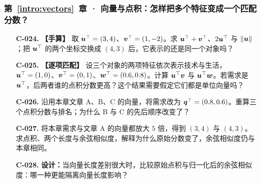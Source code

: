 \subsubsection*{第~\ref*{intro:vectors}~章 · 向量与点积：怎样把多个特征变成一个匹配分数？}
\begin{enumerate}[label={},leftmargin=4.8em,itemsep=4pt]
\item[\textbf{C-024.}] \leavevmode{}\label{exercise:C-024}\label{exercise:vector-coordinate-operations}\textbf{【手算】} 取 $\boldsymbol{u}^\top=(3,4)$、$\boldsymbol{v}^\top=(1,-2)$。求 $\boldsymbol{u}^\top+\boldsymbol{v}^\top$、$2\boldsymbol{u}^\top$ 与 $\|\boldsymbol{u}\|$；把 $\boldsymbol{u}^\top$ 的两个坐标交换成 $(4,3)$ 后，它表示的还是同一个对象吗？
\item[\textbf{C-025.}] \leavevmode{}\label{exercise:C-025}\label{exercise:unit-vector-dot-comparison}\textbf{【逐项匹配】} 设三个对象的两项特征依次表示技术与生活，$\boldsymbol{u}^\top=(1,0)$、$\boldsymbol{v}^\top=(0,1)$、$\boldsymbol{w}^\top=(0.6,0.8)$。计算 $\boldsymbol{u}^\top\boldsymbol{v}$ 与 $\boldsymbol{u}^\top\boldsymbol{w}$。若需求是 $\boldsymbol{u}^\top$，后两者谁的点积分数更高？这个结果需要假定它们都是单位向量吗？
\item[\textbf{C-026.}] \leavevmode{}\label{exercise:C-026}\label{exercise:article-query-ranking}沿用本章文章 A、B、C 的向量，将需求改为 $\boldsymbol{q}^\top=(0.8,0.6)$。重算三个点积分数与排名；为什么 B 与 C 的先后顺序改变了？
\item[\textbf{C-027.}] \leavevmode{}\label{exercise:C-027}\label{exercise:cosine-rescaling}将本章需求与文章 A 的向量都放大 $5$ 倍，得到 $(3,4)$ 与 $(4,3)$。求点积、两个长度与余弦相似度，解释为什么原始分数变了，余弦相似度仍与本章相同。
\item[\textbf{C-028.}] \leavevmode{}\label{exercise:C-028}\label{exercise:cosine-length-control}\textbf{设计：}当向量长度差别很大时，比较原始点积与归一化后的余弦相似度：哪一种更能隔离向量长度影响？
\end{enumerate}
